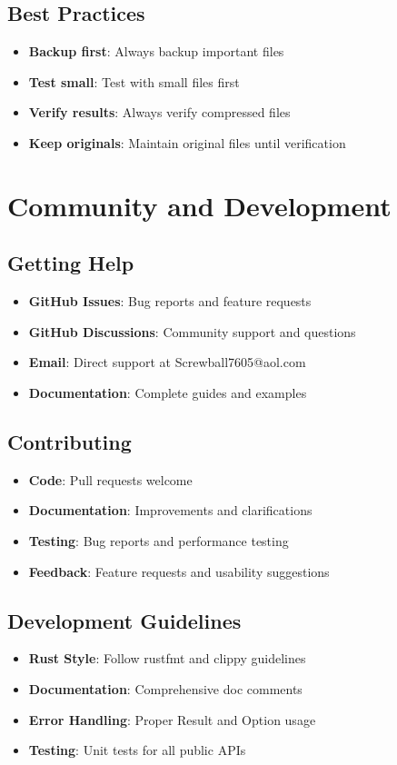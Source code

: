 \documentclass[12pt,a4paper]{article}
\makeatletter
\newcommand{\email}{Screwball7605@aol.com}
\makeatother
\begin{document}
\subsection{Best Practices}
\begin{itemize}
    \item \textbf{Backup first}: Always backup important files
    \item \textbf{Test small}: Test with small files first
    \item \textbf{Verify results}: Always verify compressed files
    \item \textbf{Keep originals}: Maintain original files until verification
\end{itemize}

\newpage

\section{Community and Development}

\subsection{Getting Help}
\begin{itemize}
    \item \textbf{GitHub Issues}: Bug reports and feature requests
    \item \textbf{GitHub Discussions}: Community support and questions
    \item \textbf{Email}: Direct support at \email
    \item \textbf{Documentation}: Complete guides and examples
\end{itemize}

\subsection{Contributing}
\begin{itemize}
    \item \textbf{Code}: Pull requests welcome
    \item \textbf{Documentation}: Improvements and clarifications
    \item \textbf{Testing}: Bug reports and performance testing
    \item \textbf{Feedback}: Feature requests and usability suggestions
\end{itemize}

\subsection{Development Guidelines}
\begin{itemize}
    \item \textbf{Rust Style}: Follow rustfmt and clippy guidelines
    \item \textbf{Documentation}: Comprehensive doc comments
    \item \textbf{Error Handling}: Proper Result and Option usage
    \item \textbf{Testing}: Unit tests for all public APIs
\end{itemize}
\end{document}
